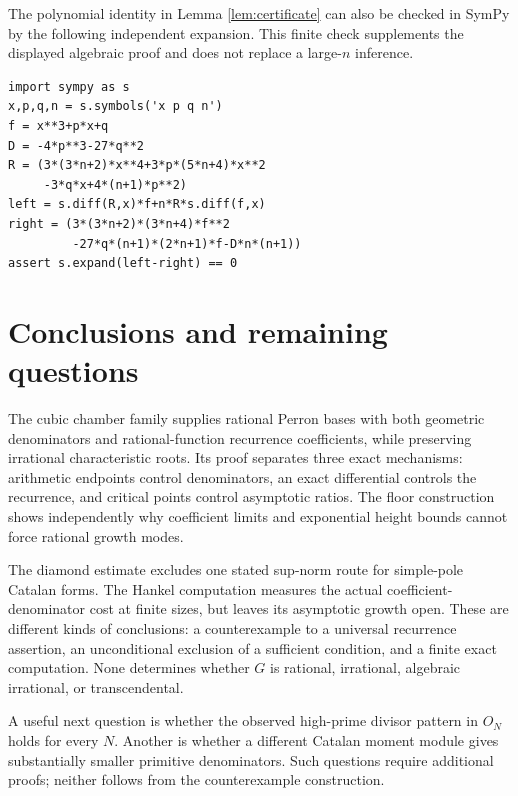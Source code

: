 \documentclass[11pt,a4paper]{article}
\theoremstyle{definition}\newtheorem{definition}[theorem]{Definition}
\theoremstyle{remark}\newtheorem{remark}[theorem]{Remark}
\begin{document}
The polynomial identity in Lemma \ref{lem:certificate} can also be checked in SymPy by the following independent expansion. This finite check supplements the displayed algebraic proof and does not replace a large-$n$ inference.
\begingroup\small
\begin{verbatim}
import sympy as s
x,p,q,n = s.symbols('x p q n')
f = x**3+p*x+q
D = -4*p**3-27*q**2
R = (3*(3*n+2)*x**4+3*p*(5*n+4)*x**2
     -3*q*x+4*(n+1)*p**2)
left = s.diff(R,x)*f+n*R*s.diff(f,x)
right = (3*(3*n+2)*(3*n+4)*f**2
         -27*q*(n+1)*(2*n+1)*f-D*n*(n+1))
assert s.expand(left-right) == 0
\end{verbatim}
\endgroup

\section{Conclusions and remaining questions}
The cubic chamber family supplies rational Perron bases with both geometric denominators and rational-function recurrence coefficients, while preserving irrational characteristic roots. Its proof separates three exact mechanisms: arithmetic endpoints control denominators, an exact differential controls the recurrence, and critical points control asymptotic ratios. The floor construction shows independently why coefficient limits and exponential height bounds cannot force rational growth modes.

The diamond estimate excludes one stated sup-norm route for simple-pole Catalan forms. The Hankel computation measures the actual coefficient-denominator cost at finite sizes, but leaves its asymptotic growth open. These are different kinds of conclusions: a counterexample to a universal recurrence assertion, an unconditional exclusion of a sufficient condition, and a finite exact computation. None determines whether $G$ is rational, irrational, algebraic irrational, or transcendental.

A useful next question is whether the observed high-prime divisor pattern in $O_N$ holds for every $N$. Another is whether a different Catalan moment module gives substantially smaller primitive denominators. Such questions require additional proofs; neither follows from the counterexample construction.
\end{document}

